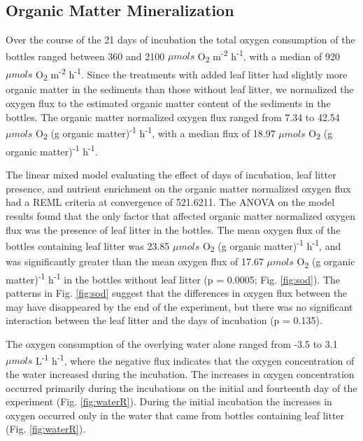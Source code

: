 \subsection{Organic Matter Mineralization}

Over the course of the 21 days of incubation the total oxygen consumption of the bottles ranged between 360 and 2100 $\mu mols$ O\textsubscript{2} m\textsuperscript{-2} h\textsuperscript{-1}, with a median of 920 $\mu mols$ O\textsubscript{2} m\textsuperscript{-2} h\textsuperscript{-1}. Since the treatments with added leaf litter had slightly more organic matter in the sediments than those without leaf litter, we normalized the oxygen flux to the estimated organic matter content of the sediments in the bottles. The organic matter normalized oxygen flux ranged from 7.34 to 42.54 $\mu mols$ O\textsubscript{2} (g organic matter)\textsuperscript{-1} h\textsuperscript{-1}, with a median flux of 18.97 $\mu mols$ O\textsubscript{2} (g organic matter)\textsuperscript{-1} h\textsuperscript{-1}.

The linear mixed model evaluating the effect of days of incubation, leaf litter presence, and nutrient enrichment on the organic matter normalized oxygen flux had a REML criteria at convergence of 521.6211. The ANOVA on the model results found that the only factor that affected organic matter normalized oxygen flux was the presence of leaf litter in the bottles. The mean oxygen flux of the bottles containing leaf litter was 23.85 $\mu mols$ O\textsubscript{2} (g organic matter)\textsuperscript{-1} h\textsuperscript{-1}, and was significantly greater than the mean oxygen flux of 17.67 $\mu mols$ O\textsubscript{2} (g organic matter)\textsuperscript{-1} h\textsuperscript{-1} in the bottles without leaf litter (p = 0.0005; Fig. \ref{fig:sod}).  The patterns in Fig. \ref{fig:sod} suggest that the differences in oxygen flux between the may have disappeared by the end of the experiment, but there was no significant interaction between the leaf litter and the days of incubation (p = 0.135).

The oxygen consumption of the overlying water alone ranged from -3.5 to 3.1 $\mu mols$ L\textsuperscript{-1} h\textsuperscript{-1}, where the negative flux indicates that the oxygen concentration of the water increased during the incubation.  The increases in oxygen concentration occurred primarily during the incubations on the initial and fourteenth day of the experiment (Fig. \ref{fig:waterR}). During the initial incubation the increases in oxygen occurred only in the water that came from bottles containing leaf litter (Fig. \ref{fig:waterR}).



